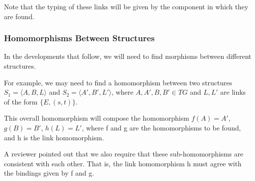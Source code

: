 Note that the typing of these links will be given by the component in which they are found.

\subsubsection{Homomorphisms Between Structures}
\label{subsubsec:structure_homomorphism}

In the developments that follow, we will need to find morphisms between different structures.

For example, we may need to find a homomorphism between two structures $S_1 = \langle A, B, L\rangle$ and  $S_2 = \langle A', B', L'\rangle$, where $A, A', B, B' \in TG$ and $L, L'$ are links of the form $\{E, (s, t)\}$.

This overall homomorphism will compose the homomorphism $f(A) = A'$, $g(B) = B'$, $h(L) = L'$, where f and g are the homomorphisms to be found, and h is the link homomorphism.

A reviewer pointed out that we also require that these sub-homomorphisms are consistent with each other. That is, the link homomorphism h must agree with 
the bindings given by f and g.




